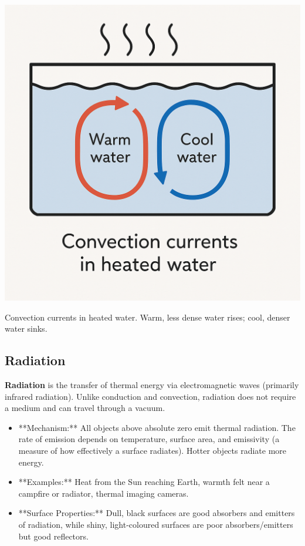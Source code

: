 \begin{marginfigure}[-10pt]
\includegraphics[width=\linewidth]{convection_currents.png} %
\caption{Convection currents in heated water. Warm, less dense water rises; cool, denser water sinks.}
\label{fig:convection}
\end{marginfigure}

\subsection{Radiation}
\FloatBarrier

\textbf{Radiation} is the transfer of thermal energy via electromagnetic waves (primarily infrared radiation). Unlike conduction and convection, radiation does not require a medium and can travel through a vacuum.
\begin{itemize}
    \item **Mechanism:** All objects above absolute zero emit thermal radiation. The rate of emission depends on temperature, surface area, and emissivity (a measure of how effectively a surface radiates). Hotter objects radiate more energy.
    \item **Examples:** Heat from the Sun reaching Earth, warmth felt near a campfire or radiator, thermal imaging cameras.
    \item **Surface Properties:** Dull, black surfaces are good absorbers and emitters of radiation, while shiny, light-coloured surfaces are poor absorbers/emitters but good reflectors.
\end{itemize}

